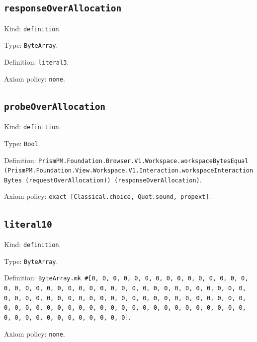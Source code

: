 \documentclass[11pt]{article}
\begin{document}
\subsection*{\texttt{responseOverAllocation}}
\noindent Kind: \texttt{definition}.\par
\noindent Type: \texttt{ByteArray}.\par
\noindent Definition: \texttt{literal3}.\par
\noindent Axiom policy: \texttt{none}.\par
\subsection*{\texttt{probeOverAllocation}}
\noindent Kind: \texttt{definition}.\par
\noindent Type: \texttt{Bool}.\par
\noindent Definition: \texttt{PrismPM.Foundation.Browser.V1.Workspace.workspaceBytesEqual (PrismPM.Foundation.View.Workspace.V1.Interaction.workspaceInteractionBytes (requestOverAllocation)) (responseOverAllocation)}.\par
\noindent Axiom policy: \texttt{exact [Classical.choice, Quot.sound, propext]}.\par
\subsection*{\texttt{literal10}}
\noindent Kind: \texttt{definition}.\par
\noindent Type: \texttt{ByteArray}.\par
\noindent Definition: \texttt{ByteArray.mk \#[0, 0, 0, 0, 0, 0, 0, 0, 0, 0, 0, 0, 0, 0, 0, 0, 0, 0, 0, 0, 0, 0, 0, 0, 0, 0, 0, 0, 0, 0, 0, 0, 0, 0, 0, 0, 0, 0, 0, 0, 0, 0, 0, 0, 0, 0, 0, 0, 0, 0, 0, 0, 0, 0, 0, 0, 0, 0, 0, 0, 0, 0, 0, 0, 0, 0, 0, 0, 0, 0, 0, 0, 0, 0, 0, 0, 0, 0, 0, 0, 0, 0, 0, 0, 0, 0, 0, 0, 0, 0, 0, 0, 0, 0, 0, 0]}.\par
\noindent Axiom policy: \texttt{none}.\par
\end{document}
